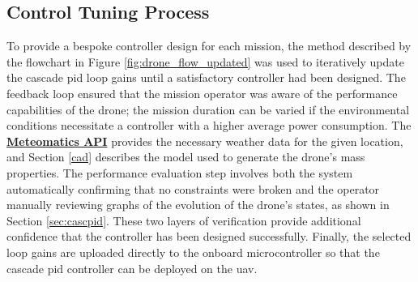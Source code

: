 \subsection{Control Tuning Process}

To provide a bespoke controller design for each mission, the method described by the flowchart in Figure \ref{fig:drone_flow_updated} was used to iteratively update the cascade \gls{pid} loop gains until a satisfactory controller had been designed. The feedback loop ensured that the mission operator was aware of the performance capabilities of the drone; the mission duration can be varied if the environmental conditions necessitate a controller with a higher average power consumption. The \href{https://www.meteomatics.com/}{\textbf{Meteomatics API}} provides the necessary weather data for the given location, and Section \ref{cad} describes the model used to generate the drone's mass properties. The performance evaluation step involves both the system automatically confirming that no constraints were broken and the operator manually reviewing graphs of the evolution of the drone's states, as shown in Section \ref{sec:cascpid}. These two layers of verification provide additional confidence that the controller has been designed successfully. Finally, the selected loop gains are uploaded directly to the onboard microcontroller so that the cascade \gls{pid} controller can be deployed on the \gls{uav}. 

